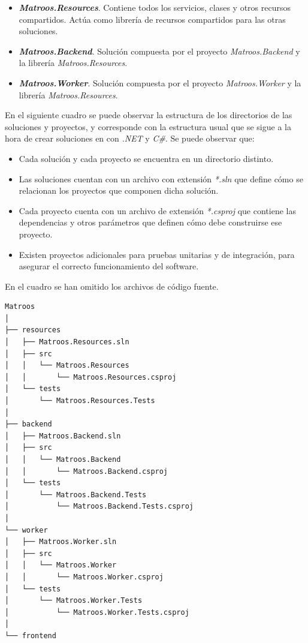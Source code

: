 \begin{itemize}
	\item \textbf{\textit{Matroos.Resources}}. Contiene todos los servicios, clases y otros recursos compartidos. Actúa como librería de recursos compartidos para las otras soluciones.
	\item \textbf{\textit{Matroos.Backend}}. Solución compuesta por el proyecto \textit{Matroos.Backend} y la librería \textit{Matroos.Resources}.
	\item \textbf{\textit{Matroos.Worker}}. Solución compuesta por el proyecto \textit{Matroos.Worker} y la librería \textit{Matroos.Resources}.
\end{itemize}

En el siguiente cuadro se puede observar la estructura de los directorios de las soluciones y proyectos, y corresponde con la estructura usual que se sigue a la hora de crear soluciones en con \textit{.NET} y \textit{C\#}. Se puede observar que:

\begin{itemize}
	\item Cada solución y cada proyecto se encuentra en un directorio distinto.
	\item Las soluciones cuentan con un archivo con extensión \textit{*.sln} que define cómo se relacionan los proyectos que componen dicha solución.
	\item Cada proyecto cuenta con un archivo de extensión \textit{*.csproj} que contiene las dependencias y otros parámetros que definen cómo debe construirse ese proyecto.
	\item Existen proyectos adicionales para pruebas unitarias y de integración, para asegurar el correcto funcionamiento del software.
\end{itemize}

{\scriptsize En el cuadro se han omitido los archivos de código fuente.}

\begin{lstlisting}[style=tree]
Matroos
│
├── resources
│   ├── Matroos.Resources.sln
│   ├── src
│   │   └── Matroos.Resources
│   │       └── Matroos.Resources.csproj
│   └── tests
│       └── Matroos.Resources.Tests
│
├── backend
│   ├── Matroos.Backend.sln
│   ├── src
│   │   └── Matroos.Backend
│   │       └── Matroos.Backend.csproj
│   └── tests
│       └── Matroos.Backend.Tests
│           └── Matroos.Backend.Tests.csproj
│
└── worker
│   ├── Matroos.Worker.sln
│   ├── src
│   │   └── Matroos.Worker
│   │       └── Matroos.Worker.csproj
│   └── tests
│       └── Matroos.Worker.Tests
│           └── Matroos.Worker.Tests.csproj
│
└── frontend
\end{lstlisting}

